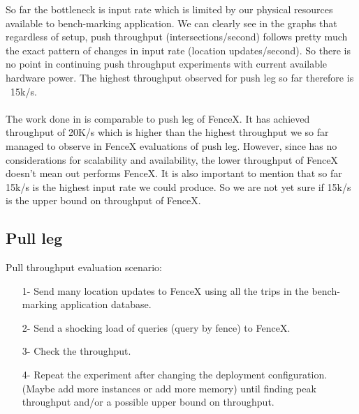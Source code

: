 \documentclass[a4]{report}
\begin{document}
    So far the bottleneck is input rate which is limited by our physical resources available to bench-marking
    application.
    We can clearly see in the graphs that regardless of setup, push throughput (intersections/second) follows pretty
    much the exact pattern of changes in input rate (location updates/second).
    So there is no point in continuing push throughput experiments with current available hardware power.
    The highest throughput observed for push leg so far therefore is ~15k/s.

    \paragraph{}
    The work done in \cite{Nechifor_Comnac_2013} is comparable to push leg of FenceX.
    It has achieved throughput of 20K/s which is higher than the highest throughput we so far managed to observe in
    FenceX evaluations of push leg.
    However, since \cite{Nechifor_Comnac_2013} has no considerations for scalability and availability, the lower
    throughput of FenceX doesn't mean \cite{Nechifor_Comnac_2013} out performs FenceX.
    It is also important to mention that so far 15k/s is the highest input rate we could produce.
    So we are not yet sure if 15k/s is the upper bound on throughput of FenceX.

    \subsection{Pull leg}
    Pull throughput evaluation scenario:
    \begin{itemize}
        \item[1-] Send many location updates to FenceX using all the trips in the bench-marking application database.
        \item[2-] Send a shocking load of queries (query by fence) to FenceX.
        \item[3-] Check the throughput.
        \item[4-] Repeat the experiment after changing the deployment configuration. (Maybe add more instances or add
        more memory) until finding peak throughput and/or a possible upper bound on throughput.
    \end{itemize}
\end{document}
